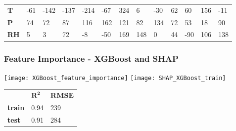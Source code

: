 \documentclass[serif, xcolor={dvipsnames}]{beamer} %
\begin{document}
\begin{frame}
\begin{itemize}
\begin{table}[!ht]
\begin{tabular}{lllllllllllll}
{\bf T}    & \tiny{-61} & \tiny{-142} & \tiny{-137} & \tiny{-214} & \tiny{-67} & \tiny{324} & \tiny{6} & \tiny{-30} & \tiny{62} & \tiny{60} & \tiny{156} & \tiny{-11}\\
{\bf P}    & \tiny{74} & \tiny{72} & \tiny{87} & \tiny{116} & \tiny{162} & \tiny{121} & \tiny{82} & \tiny{134} & \tiny{72} & \tiny{53} & \tiny{18} & \tiny{90} \\ 
{\bf RH} &  \tiny{5} & \tiny{3} & \tiny{72} & \tiny{-8} & \tiny{-50} & \tiny{169} & \tiny{148} & \tiny{0} & \tiny{44} & \tiny{-90} & \tiny{106}  & \tiny{138} \\ 
\toprule
\end{tabular}
\end{table}
\end{itemize}
\end{frame}
\begin{frame}
\frametitle{Feature Importance - XGBoost and SHAP}
\hspace{.2in}
\texttt{[image: XGBoost\_feature\_importance]}
\texttt{[image: SHAP\_XGBoost\_train]}
\begin{table}[!ht]
\label{tab:XGBErrMetrics}
\begin{tabular}{lll}
\bottomrule
\cellcolor{palecornflowerblue}{\tiny f(T, P)} &  \tiny{$\mathbf{R^2}$} & \tiny{$\mathbf{RMSE}$}  \\ 
\rowcolor{shadecolor} 
\tiny{\bf train}   &  \tiny{0.94}  &  \tiny{239}\\ 
 \tiny{\bf test}  & \tiny{0.91}  & \tiny{284}\\
\toprule
\end{tabular}\qquad
\end{table}
\end{frame}
\end{document}

